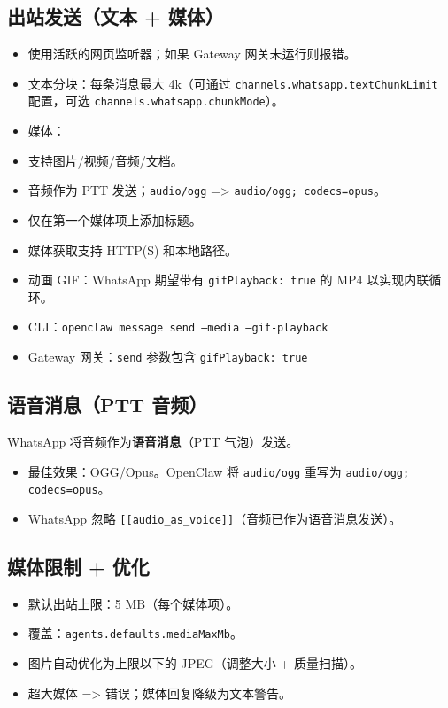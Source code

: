 \subsection{出站发送（文本 + 媒体）}


\begin{itemize}
  \item 使用活跃的网页监听器；如果 Gateway 网关未运行则报错。
  \item 文本分块：每条消息最大 4k（可通过 \texttt{channels.whatsapp.textChunkLimit} 配置，可选 \texttt{channels.whatsapp.chunkMode}）。
  \item 媒体：
  \item 支持图片/视频/音频/文档。
  \item 音频作为 PTT 发送；\texttt{audio/ogg} => \texttt{audio/ogg; codecs=opus}。
  \item 仅在第一个媒体项上添加标题。
  \item 媒体获取支持 HTTP(S) 和本地路径。
  \item 动画 GIF：WhatsApp 期望带有 \texttt{gifPlayback: true} 的 MP4 以实现内联循环。
  \item CLI：\texttt{openclaw message send --media  --gif-playback}
  \item Gateway 网关：\texttt{send} 参数包含 \texttt{gifPlayback: true}
\end{itemize}


\subsection{语音消息（PTT 音频）}


WhatsApp 将音频作为\textbf{语音消息}（PTT 气泡）发送。

\begin{itemize}
  \item 最佳效果：OGG/Opus。OpenClaw 将 \texttt{audio/ogg} 重写为 \texttt{audio/ogg; codecs=opus}。
  \item WhatsApp 忽略 \texttt{[[audio\_as\_voice]]}（音频已作为语音消息发送）。
\end{itemize}


\subsection{媒体限制 + 优化}


\begin{itemize}
  \item 默认出站上限：5 MB（每个媒体项）。
  \item 覆盖：\texttt{agents.defaults.mediaMaxMb}。
  \item 图片自动优化为上限以下的 JPEG（调整大小 + 质量扫描）。
  \item 超大媒体 => 错误；媒体回复降级为文本警告。
\end{itemize}


